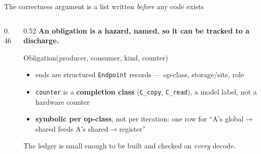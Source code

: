 \documentclass[aspectratio=169,9pt]{beamer}
\newcommand{\tsub}[1]{{\footnotesize\color{gray}#1}}
\newcommand{\key}[1]{\textcolor{acc}{\textbf{#1}}}
\begin{document}
\begin{frame}{The correctness argument is a list written \emph{before} any code exists}

\begin{columns}[T]
\begin{column}{0.46\textwidth}
\vspace{2pt}
\end{column}
\begin{column}{0.52\textwidth}
\vspace{2pt}
\key{An obligation is a hazard, named, so it can be tracked to a discharge.}

\vspace{2pt}
{\ttfamily\small Obligation(producer, consumer, kind, counter)}

\vspace{2pt}
\begin{itemize}\itemsep2pt
  \item ends are structured \texttt{Endpoint} records --- op-class, storage/site, role
  \item \texttt{counter} is a \key{completion class} (\texttt{C\_copy}, \texttt{C\_read}), a model label, not a hardware counter
  \item \key{symbolic per op-class}, not per iteration: one row for ``A's global$\to$shared feeds A's shared$\to$register''
\end{itemize}
\vspace{3pt}
The ledger is small enough to be built and checked on \emph{every} decode.
\end{column}
\end{columns}
\end{frame}
\end{document}
